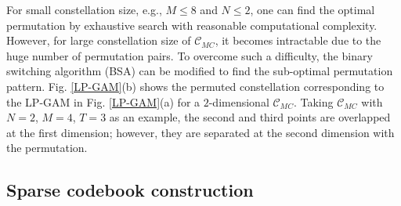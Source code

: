 \documentclass[journal]{IEEEtran}
\begin{document}
 

   
 
For small constellation size, e.g.,  $M \leq 8$   and $N \leq 2$, one can find the optimal permutation by exhaustive search with reasonable computational complexity. However, for large   constellation size of   $\boldsymbol {\mathcal C}_{MC}$, it becomes intractable due to the huge number of permutation pairs.  To overcome such a difficulty, the binary switching algorithm (BSA)   \cite{zeger1990pseudo} can be modified to find the sub-optimal permutation pattern. Fig.  \ref{LP-GAM}(b) shows the  permuted constellation corresponding to the LP-GAM in  Fig. \ref{LP-GAM}(a) for a  $2$-dimensional $\boldsymbol {\mathcal C}_{MC}$. Taking    $\boldsymbol {\mathcal C}_{MC}$ with $N=2$, $M=4$, $T=3$ as an example, the second and third points are overlapped at the first  dimension; however, they are  separated at the second dimension with the permutation.  %
 
 
 \subsection{Sparse codebook construction}
\end{document}
